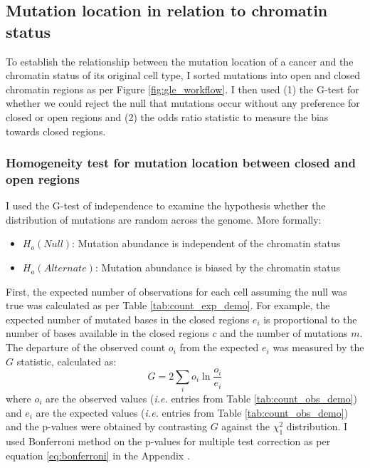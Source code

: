 \subsection{Mutation location in relation to chromatin status}\label{methods:chromatin}
To establish the relationship between the mutation location of a cancer and the chromatin status of its original cell type, I sorted mutations into open and closed chromatin regions as per Figure \ref{fig:gle_workflow}. I then used (1) the G-test for whether we could reject the null that mutations occur without any preference for closed or open regions and (2) the odds ratio statistic to measure the bias towards closed regions.



\subsubsection{Homogeneity test for mutation location between closed and open regions}
I used the G-test of independence \citep{McDonald2014GtestStatistics} to examine the hypothesis whether the distribution of mutations are random across the genome. More formally:

\begin{itemize}
    \item $H_o (Null)$: Mutation abundance is independent of the chromatin status
    \item $H_a (Alternate)$: Mutation abundance is biased by the chromatin status
\end{itemize}

First, the expected number of observations for each cell assuming the null was true was calculated as per Table \ref{tab:count_exp_demo}. For example, the expected number of mutated bases in the closed regions $e_i$ is proportional to the number of bases available in the closed regions $c$ and the number of mutations $m$. The departure of the observed count $o_i$ from the expected $e_i$ was measured by the $G$ statistic, calculated as:
\begin{equation}
    G = 2 \underset{i}{\sum} o_{i} \ln \frac{o_{i}}{e_{i}}
    \label{eq:g}
\end{equation}
where $o_{i}$ are the observed values (\textit{i.e.} entries from Table \ref{tab:count_obs_demo}) and $e_{i}$ are the expected values (\textit{i.e.} entries from Table \ref{tab:count_obs_demo}) and the p-values were obtained by contrasting $G$ against the $\chi^2_1$ distribution. I used Bonferroni method on the p-values for multiple test correction as per equation \ref{eq:bonferroni} in the Appendix \citep{Armstrong2014WhenCorrection}.

